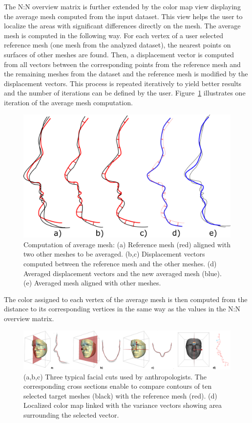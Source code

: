 \documentclass[final,5p,times]{elsarticle}
\begin{document}
The N:N overview matrix is further extended by the color map view displaying the average mesh computed from the input dataset. 
This view helps the user to localize the areas with significant differences directly on the mesh.
The average mesh is computed in the following way.
For each vertex of a user selected reference mesh (one mesh from the analyzed dataset), the nearest points on surfaces of other meshes are found.
Then, a displacement vector is computed from all vectors between the corresponding points from the reference mesh and the remaining meshes from the dataset and the reference mesh is modified by the displacement vectors.
This process is repeated iteratively to yield better results and the number of iterations can be defined by the user. Figure~\ref{fig:average} illustrates one iteration of the average mesh computation.

\begin{figure}[htb]
	\centering
  \includegraphics[width=0.9\linewidth]{pictures/average.pdf}
  \caption{\label{fig:average} Computation of average mesh: (a) Reference mesh (red) aligned with two other meshes to be averaged. (b,c) Displacement vectors computed between the reference mesh and the other meshes. (d) Averaged displacement vectors and the new averaged mesh (blue). (e) Averaged mesh aligned with other meshes.}
	\vspace{-3mm}
\end{figure}

The color assigned to each vertex of the average mesh is then computed from the distance to its corresponding vertices in the same way as the values in the N:N overview matrix.

\begin{figure}[htb]
	\centering
  \includegraphics[width=0.9\linewidth]{pictures/cross.png}
  \caption{\label{fig:cross} (a,b,c) Three typical facial cuts used by anthropologists. The corresponding cross sections enable to compare contours of ten selected target meshes (black) with the reference mesh (red). (d) Localized color map linked with the variance vectors showing area surrounding the selected vector.}
\end{figure}
\end{document}
